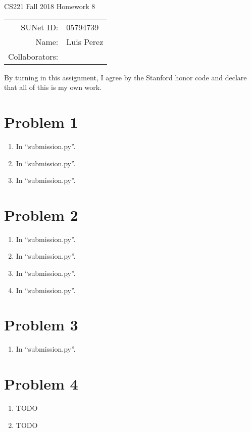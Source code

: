 \documentclass[12pt]{article}
\begin{document}
\begin{center}
{\Large CS221 Fall 2018 Homework 8}

\begin{tabular}{rl}
SUNet ID: & 05794739 \\
Name: & Luis Perez \\
Collaborators: &
\end{tabular}
\end{center}

By turning in this assignment, I agree by the Stanford honor code and declare
that all of this is my own work.

\section*{Problem 1}

\begin{enumerate}[label=(\alph*)]
  \item In ``submission.py''.
  \item In ``submission.py''.
  \item In ``submission.py''.
\end{enumerate}

\section*{Problem 2}

\begin{enumerate}[label=(\alph*)]
  \item In ``submission.py''.
  \item In ``submission.py''.
  \item In ``submission.py''.
  \item In ``submission.py''.
\end{enumerate}

\section*{Problem 3}

\begin{enumerate}[label=(\alph*)]
  \item In ``submission.py''.
\end{enumerate}

\section*{Problem 4}

\begin{enumerate}[label=(\alph*)]
  \item TODO
  \item TODO
\end{enumerate}
\end{document}
